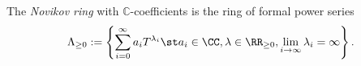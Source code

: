 
 
 
The \emph{Novikov ring} with $\mathbb C$-coefficients is the ring of formal power series
\[\Lambda_{\geq 0}:=  \left\{\sum_{i=0}^\infty  a_i T^{\lambda_i}\st a_i\in \CC, \lambda \in \RR_{\geq 0}, \lim_{i\to\infty} \lambda_i = \infty\right\}.
\]

 